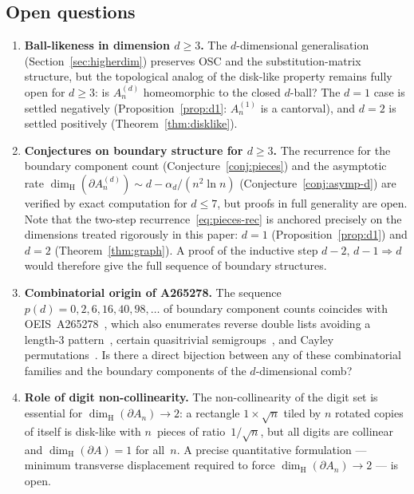 \documentclass{amsart}
\theoremstyle{definition}
\theoremstyle{remark}
\newcommand{\dH}{\dim_{\mathrm{H}}}
\begin{document}
\subsection*{Open questions}

\begin{enumerate}

\item \textbf{Ball-likeness in dimension $d \ge 3$.}
The $d$-dimensional generalisation (Section~\ref{sec:higherdim})
preserves OSC and the substitution-matrix structure, but the
topological analog of the disk-like property remains fully open
for $d \ge 3$: is $A_n^{(d)}$ homeomorphic to the closed
$d$-ball?  The $d = 1$ case is settled negatively
(Proposition~\ref{prop:d1}: $A_n^{(1)}$ is a cantorval), and
$d = 2$ is settled positively (Theorem~\ref{thm:disklike}).

\item \textbf{Conjectures on boundary structure for $d \ge 3$.}
The recurrence for the boundary component count
(Conjecture~\ref{conj:pieces}) and the asymptotic rate
$\dH(\partial A_n^{(d)}) \sim d - \alpha_d/(n^2\ln n)$
(Conjecture~\ref{conj:asymp-d}) are verified by exact
computation for $d \le 7$, but proofs in full generality
are open.  Note that the two-step recurrence~\eqref{eq:pieces-rec}
is anchored precisely on the dimensions treated rigorously in
this paper: $d = 1$ (Proposition~\ref{prop:d1}) and $d = 2$
(Theorem~\ref{thm:graph}).
A proof of the inductive step
$d{-}2,\,d{-}1 \Rightarrow d$ would therefore give the full
sequence of boundary structures.

\item \textbf{Combinatorial origin of A265278.}
The sequence $p(d) = 0, 2, 6, 16, 40, 98, \ldots$ of boundary
component counts coincides with OEIS~A265278~\cite{oeis-A265278},
which also enumerates reverse double lists avoiding a length-$3$
pattern~\cite{diepenbroek-maus-stoll}, certain quasitrivial
semigroups~\cite{couceiro-devillet-marichal}, and Cayley
permutations~\cite{golab}.  Is there a direct bijection between
any of these combinatorial families and the boundary components
of the $d$-dimensional comb?

\item \textbf{Role of digit non-collinearity.}
The non-collinearity of the digit set is essential for
$\dH(\partial A_n) \to 2$: a rectangle $1 \times \sqrt{n}$ tiled
by $n$ rotated copies of itself is disk-like with $n$~pieces of
ratio~$1/\!\sqrt{n}$, but all digits are collinear and
$\dH(\partial A) = 1$ for all~$n$.  A precise quantitative
formulation --- minimum transverse displacement required to force
$\dH(\partial A_n) \to 2$ --- is open.


\end{enumerate}
\end{document}
